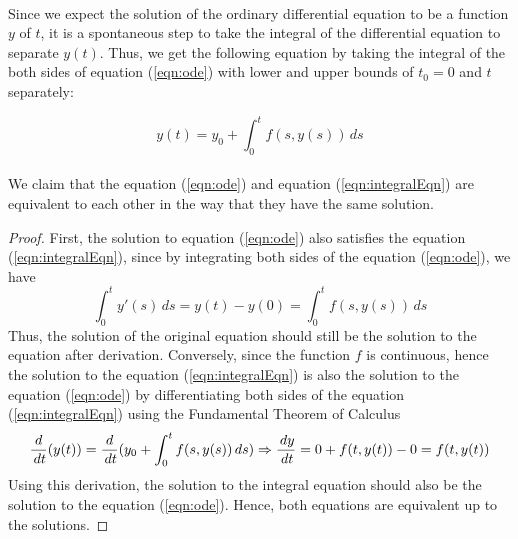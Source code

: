\documentclass{article}
\theoremstyle{definition}
\theoremstyle{remark}
\theoremstyle{example}
\begin{document}
\paragraph{  }

Since we expect the solution of the ordinary differential equation to be a function $y$ of $t$, it is a spontaneous step to take the integral of the differential equation to separate $y(t)$. Thus, we get the following equation by taking the integral of the both sides of equation (\ref{eqn:ode}) with lower and upper bounds of $t_0 = 0$ and $t$ separately:

\begin{equation}\label{eqn:integralEqn}
    y(t) = y_0 + \int_{0}^{t} f(s,y(s))\,ds
\end{equation}

\paragraph{  }

We claim that the equation (\ref{eqn:ode}) and equation (\ref{eqn:integralEqn}) are equivalent to each other in the way that they have the same solution. 

\begin{proof}
    First, the solution to equation (\ref{eqn:ode}) also satisfies the equation (\ref{eqn:integralEqn}), since by integrating both sides of the equation (\ref{eqn:ode}), we have 
    \begin{equation}
        \int_{0}^{t}y'(s)\,ds = y(t) - y(0) = \int_{0}^{t} f(s,y(s)) \,ds
    \end{equation}
    Thus, the solution of the original equation should still be the solution to the equation after derivation.
    Conversely, since the function $f$ is continuous, hence the solution to the equation (\ref{eqn:integralEqn}) is also the solution to the equation (\ref{eqn:ode}) by differentiating both sides of the equation (\ref{eqn:integralEqn}) using the Fundamental Theorem of Calculus
    \begin{equation}\label{eqn:successive}
        \dfrac{d}{\,dt}{(y(t))} = \dfrac{d}{\,dt}{(y_0 + \int_{0}^{t}{f(s,y(s))\,ds})}\\
        \Rightarrow \dfrac{\,dy}{\,dt} = 0 + f(t,y(t)) - 0 = f(t,y(t))
    \end{equation}
    Using this derivation, the solution to the integral equation should also be the solution to the equation (\ref{eqn:ode}). Hence, both equations are equivalent up to the solutions.
\end{proof}
\end{document}
